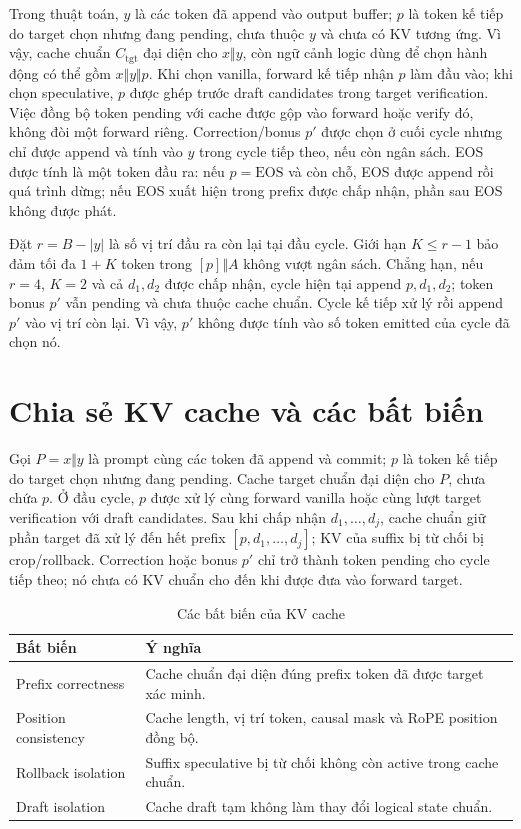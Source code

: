 Trong thuật toán, $y$ là các token đã append vào output buffer; $p$ là token kế tiếp do target chọn nhưng đang pending, chưa thuộc $y$ và chưa có KV tương ứng. Vì vậy, cache chuẩn $C_{\mathrm{tgt}}$ đại diện cho $x\Vert y$, còn ngữ cảnh logic dùng để chọn hành động có thể gồm $x\Vert y\Vert p$. Khi chọn vanilla, forward kế tiếp nhận $p$ làm đầu vào; khi chọn speculative, $p$ được ghép trước draft candidates trong target verification. Việc đồng bộ token pending với cache được gộp vào forward hoặc verify đó, không đòi một forward riêng. Correction/bonus $p'$ được chọn ở cuối cycle nhưng chỉ được append và tính vào $y$ trong cycle tiếp theo, nếu còn ngân sách. EOS được tính là một token đầu ra: nếu $p=\mathrm{EOS}$ và còn chỗ, EOS được append rồi quá trình dừng; nếu EOS xuất hiện trong prefix được chấp nhận, phần sau EOS không được phát.

Đặt $r=B-|y|$ là số vị trí đầu ra còn lại tại đầu cycle. Giới hạn $K\le r-1$ bảo đảm tối đa $1+K$ token trong $[p]\Vert A$ không vượt ngân sách. Chẳng hạn, nếu $r=4$, $K=2$ và cả $d_1,d_2$ được chấp nhận, cycle hiện tại append $p,d_1,d_2$; token bonus $p'$ vẫn pending và chưa thuộc cache chuẩn. Cycle kế tiếp xử lý rồi append $p'$ vào vị trí còn lại. Vì vậy, $p'$ không được tính vào số token emitted của cycle đã chọn nó.

\section{Chia sẻ KV cache và các bất biến}
Gọi $P=x\Vert y$ là prompt cùng các token đã append và commit; $p$ là token kế tiếp do target chọn nhưng đang pending. Cache target chuẩn đại diện cho $P$, chưa chứa $p$. Ở đầu cycle, $p$ được xử lý cùng forward vanilla hoặc cùng lượt target verification với draft candidates. Sau khi chấp nhận $d_1,\ldots,d_j$, cache chuẩn giữ phần target đã xử lý đến hết prefix $[p,d_1,\ldots,d_j]$; KV của suffix bị từ chối bị crop/rollback. Correction hoặc bonus $p'$ chỉ trở thành token pending cho cycle tiếp theo; nó chưa có KV chuẩn cho đến khi được đưa vào forward target.

\begin{table}[H]
\centering
\caption{Các bất biến của KV cache}\label{tab:kv-invariants}
\begin{tabularx}{0.92\textwidth}{@{}p{3.4cm}X@{}}
\toprule
\textbf{Bất biến} & \textbf{Ý nghĩa} \\
\midrule
Prefix correctness & Cache chuẩn đại diện đúng prefix token đã được target xác minh. \\
Position consistency & Cache length, vị trí token, causal mask và RoPE position đồng bộ. \\
Rollback isolation & Suffix speculative bị từ chối không còn active trong cache chuẩn. \\
Draft isolation & Cache draft tạm không làm thay đổi logical state chuẩn. \\
\bottomrule
\end{tabularx}
\end{table}

